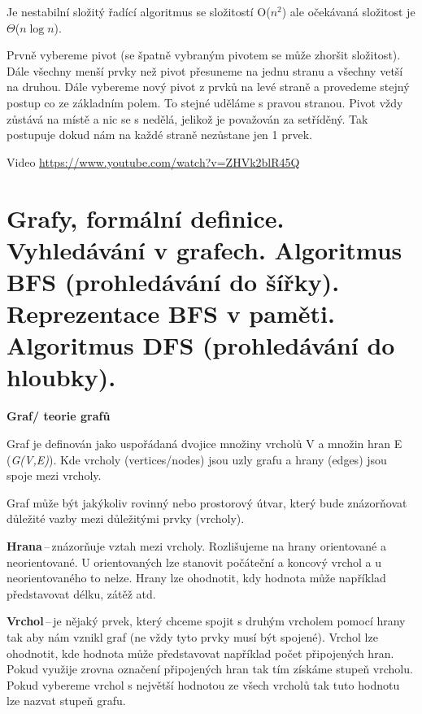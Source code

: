 Je nestabilní složitý řadící algoritmus se složitostí O($n^2$) ale očekávaná složitost je $\Theta$($n\log{n}$).

Prvně vybereme pivot (se špatně vybraným pivotem se může zhoršit složitost). Dále všechny menší prvky než pivot přesuneme na jednu stranu a všechny vetší na druhou. Dále vybereme nový pivot z prvků na levé straně a provedeme stejný postup co ze základním polem. To stejné uděláme s pravou stranou. Pivot vždy zůstává na místě a nic se s nedělá, jelikož je považován za setříděný. Tak postupuje dokud nám na každé straně nezůstane jen 1 prvek.

Video \url{https://www.youtube.com/watch?v=ZHVk2blR45Q}










\newpage
\section{Grafy, formální definice. Vyhledávání v grafech. Algoritmus BFS (prohledávání do šířky). Reprezentace BFS v paměti. Algoritmus DFS (prohledávání do hloubky).}


\begin{Large}\vspace{0,5cm} \textbf{Graf/ teorie grafů}
\end{Large}

Graf je definován jako uspořádaná dvojice množiny vrcholů V a množin hran E (\textit{G(V,E)}). Kde vrcholy (vertices/nodes) jsou uzly grafu a hrany (edges) jsou spoje mezi vrcholy. 

Graf může být jakýkoliv rovinný nebo prostorový útvar, který bude znázorňovat důležité vazby mezi důležitými prvky (vrcholy).

\textbf{Hrana}\,--\,znázorňuje vztah mezi vrcholy. Rozlišujeme na hrany orientované a neorientované. U orientovaných lze stanovit počáteční a koncový vrchol a u neorientovaného to nelze. Hrany lze ohodnotit, kdy hodnota může například představovat délku, zátěž atd.

\textbf{Vrchol}\,--\,je nějaký prvek, který chceme spojit s druhým vrcholem pomocí hrany tak aby nám vznikl graf (ne vždy tyto prvky musí být spojené). Vrchol lze ohodnotit, kde hodnota může představovat například počet připojených hran. Pokud využije zrovna označení připojených hran tak tím získáme stupeň vrcholu. Pokud vybereme vrchol s největší hodnotou ze všech vrcholů tak tuto hodnotu lze nazvat stupeň grafu.

